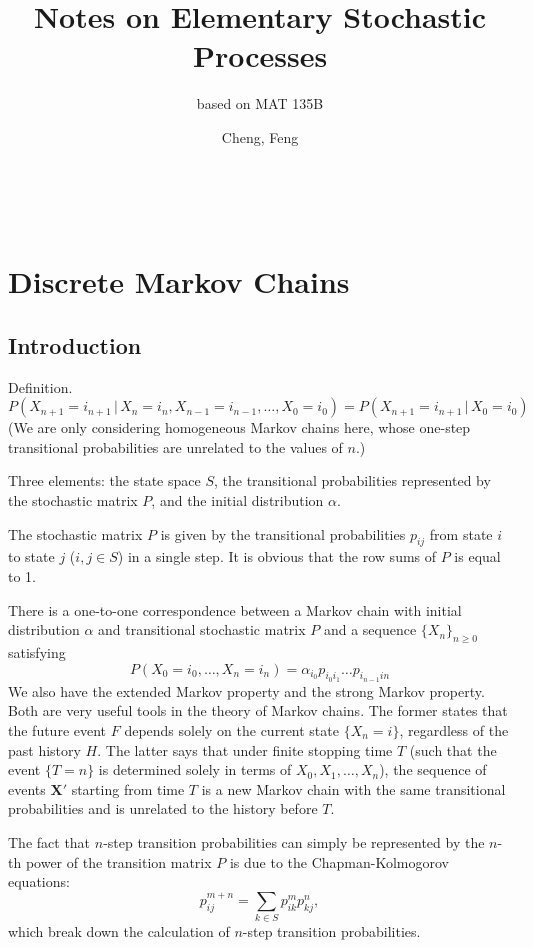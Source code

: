 \documentclass[11pt]{article}
\title{Notes on Elementary Stochastic Processes}
\author{Cheng, Feng}
\subtitle{based on MAT 135B}
\makeatletter
\newcommand{\where}{\,|\,}
\let\@subtitle\@empty %
\newcommand{\makemytitle}{
    \begin{center}
        {\Large \@title}
        \@subtitle
        \vspace{0.5em}
        \\ \@author
        \vspace{-0.5em}
    \end{center}
}
\makeatother
\begin{document}
\makemytitle


\setcounter{secnumdepth}{0}

\section{Discrete Markov Chains}

\subsection{Introduction}
Definition.
\[
P(X_{n+1}=i_{n+1} \where X_{n}=i_{n},X_{n- 1}=i_{n- 1},\dots ,X_{0}=i_{0})=P(X_{n+1}=i_{n+1} \where X_{0}=i_{0})
\]
(We are only considering homogeneous Markov chains here, whose one-step transitional probabilities are unrelated to the values of $n$.)

Three elements: the state space $S$, the transitional probabilities represented by the stochastic matrix $P$, and the initial distribution $\alpha $.

The stochastic matrix $P$ is given by the transitional probabilities $p_{ij}$ from state $i$ to state $j$ ($i,j\in S$) in a single step. It is obvious that the row sums of $P$ is equal to 1.

There is a one-to-one correspondence between a Markov chain with initial distribution $\alpha $ and transitional stochastic matrix $P$ and a sequence $\{X_{n}\}_{n\geq 0}$ satisfying
\[
P(X_{0}=i_{0},\dots ,X_{n}=i_{n})=\alpha _{i_{0}}p_{i_{0}i_{1}}\dots p_{i_{n- 1}in}
\]
We also have the extended Markov property and the strong Markov property. Both are very useful tools in the theory of Markov chains.
The former states that the future event $F$ depends solely on the current state $\{X_{n}=i\}$, regardless of the past history $H$.
The latter says that under finite stopping time $T$ (such that the event $\{T=n\}$ is determined solely in terms of $X_{0},X_{1},\dots ,X_{n}$), the sequence of events $\mathbf{X' }$ starting from time $T$ is a new Markov chain with the same transitional probabilities and is unrelated to the history before $T$.

The fact that $n$-step transition probabilities can simply be represented by the $n$-th power of the transition matrix $P$ is due to the Chapman-Kolmogorov equations:
\[
p_{ij}^{m+n}=\sum_{k\in S}p_{ik}^{m}p_{kj}^{n},
\]
which break down the calculation of $n$-step transition probabilities.
\end{document}
